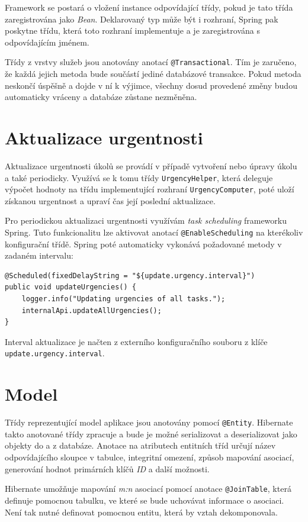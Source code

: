 \documentclass[thesis=B,czech]{FITthesis}[2012/06/26]
\begin{document}
		Framework se postará o vložení instance odpovídající třídy, pokud je tato třída zaregistrována jako \textit{Bean}. Deklarovaný typ může být i rozhraní, Spring pak poskytne třídu, která toto rozhraní implementuje a je zaregistrována s odpovídajícím jménem.
		
		Třídy z vrstvy služeb jsou anotovány anotací \texttt{@Transactional}. Tím je zaručeno, že každá jejich metoda bude součástí jediné databázové transakce. Pokud metoda neskončí úspěšně a dojde v ní k výjimce, všechny dosud provedené změny budou automaticky vráceny a databáze zůstane nezměněna.
	
	\section{Aktualizace urgentnosti}
		Aktualizace urgentnosti úkolů se provádí v případě vytvoření nebo úpravy úkolu a také periodicky. Využívá se k tomu třídy \texttt{UrgencyHelper}, která deleguje výpočet hodnoty na třídu implementující rozhraní \texttt{UrgencyComputer}, poté uloží získanou urgentnost a upraví čas její poslední aktualizace.
		
		Pro periodickou aktualizaci urgentnosti využívám \textit{task scheduling} frameworku Spring. Tuto funkcionalitu lze aktivovat anotací \texttt{@EnableScheduling} na kterékoliv konfigurační třídě. Spring poté automaticky vykonává požadované metody v zadaném intervalu:
		\begin{Verbatim}
@Scheduled(fixedDelayString = "${update.urgency.interval}")
public void updateUrgencies() {
	logger.info("Updating urgencies of all tasks.");
	internalApi.updateAllUrgencies();
}
		\end{Verbatim}
		Interval aktualizace je načten z externího konfiguračního souboru z klíče \texttt{update.urgency.interval}.
	
	\section{Model}
		Třídy reprezentující model aplikace jsou anotovány pomocí \texttt{@Entity}. Hibernate takto anotované třídy zpracuje a bude je možné serializovat a deserializovat jako objekty do a z databáze. Anotace na atributech entitních tříd určují název odpovídajícího sloupce v tabulce, integritní omezení, způsob mapování asociací, generování hodnot primárních klíčů \textit{ID} a další možnosti.
		
		Hibernate umožňuje mapování \textit{m:n} asociací pomocí anotace \texttt{@JoinTable}, která definuje pomocnou tabulku, ve které se bude uchovávat informace o asociaci. Není tak nutné definovat pomocnou entitu, která by vztah dekomponovala.
		
\end{document}

